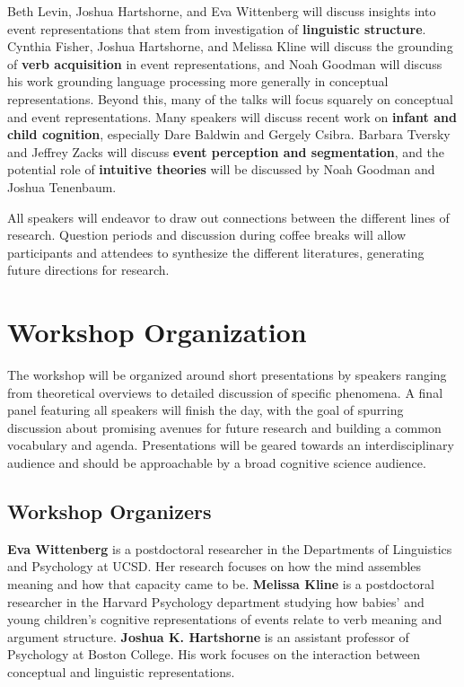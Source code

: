 \documentclass[10pt,letterpaper]{article}
\begin{document}
Beth Levin, Joshua Hartshorne, and Eva Wittenberg will discuss insights into event
representations that stem from investigation of \textbf{linguistic structure}. Cynthia Fisher, Joshua Hartshorne, and
Melissa Kline will discuss the grounding of \textbf{verb acquisition} in event representations, and Noah Goodman
will discuss his work grounding language processing more generally in
conceptual representations. Beyond this, many of the talks will focus squarely on {conceptual and event representations}. Many speakers
will discuss recent work on \textbf{infant and child cognition}, especially Dare Baldwin and
Gergely Csibra. Barbara Tversky and Jeffrey Zacks will discuss \textbf{event
perception and segmentation}, and the potential role of
\textbf{intuitive theories} will be discussed by Noah Goodman and
Joshua Tenenbaum.

All speakers will endeavor to draw out connections between the
different lines of research. Question periods and discussion during
coffee breaks will allow participants and attendees
to synthesize the different literatures, generating future directions
for research.

\section{Workshop Organization}

The workshop will be organized around short
presentations by speakers ranging from
theoretical overviews to detailed discussion of specific
phenomena. A final panel featuring all speakers will finish the day, with the goal of spurring discussion about
promising avenues for future research and building a common
vocabulary and agenda. Presentations will be geared towards an
interdisciplinary audience and should be approachable by a broad
cognitive science audience.

\subsection{Workshop Organizers}

\textbf{Eva Wittenberg} is a postdoctoral researcher in the
Departments of Linguistics and Psychology at UCSD. Her research
focuses on how the mind assembles meaning and how that capacity came
to be. \textbf{Melissa Kline} is a postdoctoral researcher in the Harvard Psychology department studying how babies' and young children's cognitive representations of events relate to verb meaning and argument structure.
\textbf{Joshua K. Hartshorne} is an assistant professor of
Psychology at Boston College. His work focuses on the interaction
between conceptual and linguistic representations.
\end{document}
